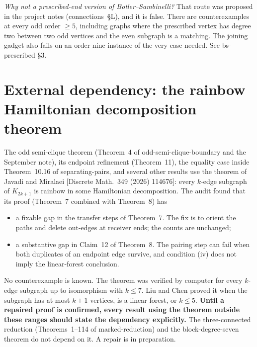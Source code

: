 \documentclass[11pt]{amsart}
\begin{document}
\emph{Why not a prescribed-end version of Botler--Sambinelli?} That route was proposed in the project
notes (connections~\S L), and it is false. There are counterexamples at every odd order $\ge5$, including
graphs where the prescribed vertex has degree two between two odd vertices and the even subgraph is a
matching. The joining gadget also fails on an order-nine instance of the very case needed. See
bs-prescribed \S3.

\section{External dependency: the rainbow Hamiltonian decomposition theorem}\label{sec:jm}

The odd semi-clique theorem (Theorem~4 of odd-semi-clique-boundary and the September note), its
endpoint refinement (Theorem~11), the equality case inside Theorem~10.16 of separating-pairs, and
several other results use the theorem of Javadi and Miralaei [Discrete Math.\ 349 (2026) 114676]: every
$k$-edge subgraph of $K_{2k+1}$ is rainbow in some Hamiltonian decomposition. The audit found that its
proof (Theorem~7 combined with Theorem~8) has
\begin{itemize}
\item a fixable gap in the transfer steps of Theorem~7. The fix is to orient the paths and delete
out-edges at receiver ends; the counts are unchanged;
\item a substantive gap in Claim~12 of Theorem~8. The pairing step can fail when both duplicates of an
endpoint edge survive, and condition (iv) does not imply the linear-forest conclusion.
\end{itemize}
No counterexample is known. The theorem was verified by computer for every $k$-edge subgraph up to
isomorphism with $k\le7$. Liu and Chen proved it when the subgraph has at most $k+1$ vertices, is a
linear forest, or $k\le5$. \textbf{Until a repaired proof is confirmed, every result using the theorem
outside these ranges should state the dependency explicitly.} The three-connected reduction
(Theorems~1--114 of marked-reduction) and the block-degree-seven theorem do not depend on it. A repair
is in preparation.
\end{document}
